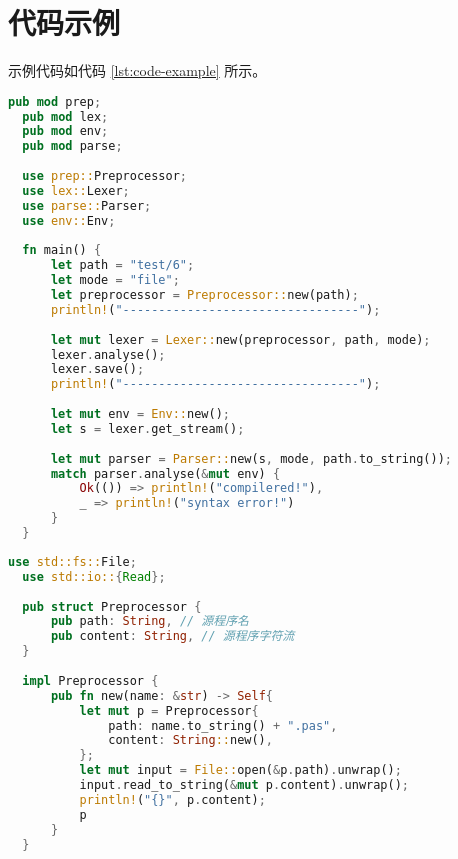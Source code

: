 \section{代码示例}

示例代码如代码 \ref{lst:code-example} 所示。

\begin{lstlisting}[caption={总控程序main.rs}, label={l:code-example}, captionpos=t, language=rust]
  pub mod prep;
  pub mod lex;
  pub mod env;
  pub mod parse;
  
  use prep::Preprocessor;
  use lex::Lexer;
  use parse::Parser;
  use env::Env;
  
  fn main() {
      let path = "test/6";
      let mode = "file";
      let preprocessor = Preprocessor::new(path);
      println!("---------------------------------");
  
      let mut lexer = Lexer::new(preprocessor, path, mode);
      lexer.analyse();
      lexer.save();
      println!("---------------------------------");
  
      let mut env = Env::new();
      let s = lexer.get_stream();
      
      let mut parser = Parser::new(s, mode, path.to_string());
      match parser.analyse(&mut env) {
          Ok(()) => println!("compilered!"),
          _ => println!("syntax error!")
      }
  }
\end{lstlisting}

\begin{lstlisting}[caption={预处理器prep.rs}, label={2:code-example}, captionpos=t, language=rust]
  use std::fs::File;
  use std::io::{Read};
  
  pub struct Preprocessor {
      pub path: String, // 源程序名
      pub content: String, // 源程序字符流
  }
  
  impl Preprocessor {
      pub fn new(name: &str) -> Self{
          let mut p = Preprocessor{
              path: name.to_string() + ".pas",
              content: String::new(),
          };
          let mut input = File::open(&p.path).unwrap();
          input.read_to_string(&mut p.content).unwrap();
          println!("{}", p.content);
          p
      }
  }
  
\end{lstlisting}

\begin{lstlisting}[caption={词法分析器lex.rs}, label={3:code-example}, captionpos=t, language=rust]

\end{lstlisting}

